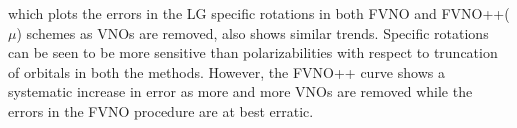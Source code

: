 which plots the errors in the LG specific rotations in both FVNO and FVNO++($\mu$) schemes as VNOs
are removed, also shows similar trends. Specific rotations can be seen to be more 
sensitive than polarizabilities with respect to truncation of orbitals in both the methods.
However, the FVNO++ curve shows a systematic increase in error as more and more VNOs are
removed while the errors in the FVNO procedure are at best erratic.




